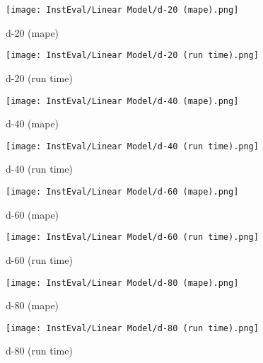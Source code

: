 \documentclass[12pt]{article}
\begin{document}
\begin{figure}[H]
\centering
    \begin{minipage}{0.45\textwidth}
        \centering
        \texttt{[image: InstEval/Linear Model/d-20 (mape).png]}
        \caption{d-20 (mape)}
        
    \end{minipage}\hfill
    \begin{minipage}{0.45\textwidth}
        \centering
        \texttt{[image: InstEval/Linear Model/d-20 (run time).png]}
        \caption{d-20 (run time)}
    \end{minipage}
\end{figure}

\begin{figure}[H]
\centering
    \begin{minipage}{0.45\textwidth}
        \centering
        \texttt{[image: InstEval/Linear Model/d-40 (mape).png]}
        \caption{d-40 (mape)}
        
    \end{minipage}\hfill
    \begin{minipage}{0.45\textwidth}
        \centering
        \texttt{[image: InstEval/Linear Model/d-40 (run time).png]}
        \caption{d-40 (run time)}
    \end{minipage}
\end{figure}

\begin{figure}[H]
\centering
    \begin{minipage}{0.45\textwidth}
        \centering
        \texttt{[image: InstEval/Linear Model/d-60 (mape).png]}
        \caption{d-60 (mape)}
        
    \end{minipage}\hfill
    \begin{minipage}{0.45\textwidth}
        \centering
        \texttt{[image: InstEval/Linear Model/d-60 (run time).png]}
        \caption{d-60 (run time)}
    \end{minipage}
\end{figure}

\begin{figure}[H]
\centering
    \begin{minipage}{0.45\textwidth}
        \centering
        \texttt{[image: InstEval/Linear Model/d-80 (mape).png]}
        \caption{d-80 (mape)}
        
    \end{minipage}\hfill
    \begin{minipage}{0.45\textwidth}
        \centering
        \texttt{[image: InstEval/Linear Model/d-80 (run time).png]}
        \caption{d-80 (run time)}
    \end{minipage}
\end{figure}
\end{document}
